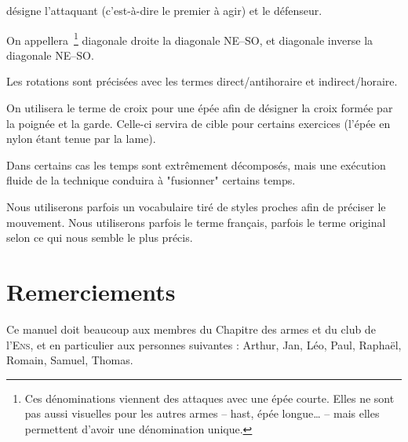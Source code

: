 \A désigne l'attaquant (c'est-à-dire le premier à agir) et \D le défenseur.

On appellera~\footnote{Ces dénominations viennent des attaques avec une épée courte. Elles ne sont pas aussi visuelles pour les autres armes – hast, épée longue… – mais elles permettent d'avoir une dénomination unique.} diagonale droite la diagonale NE–SO, et diagonale inverse la diagonale NE–SO.

Les rotations sont précisées avec les termes direct/antihoraire et indirect/horaire.

On utilisera le terme de croix pour une épée afin de désigner la croix formée par la poignée et la garde.
Celle-ci servira de cible pour certains exercices (l'épée en nylon étant tenue par la lame).

Dans certains cas les temps sont extrêmement décomposés, mais une exécution fluide de la technique conduira à "fusionner" certains temps.

Nous utiliserons parfois un vocabulaire tiré de styles proches afin de préciser le mouvement.
Nous utiliserons parfois le terme français, parfois le terme original selon ce qui nous semble le plus précis.


\section{Remerciements}


Ce manuel doit beaucoup aux membres du Chapitre des armes et du club de l'\textsc{Ens}, et en particulier aux personnes suivantes : Arthur, Jan, Léo, Paul, Raphaël, Romain, Samuel, Thomas.
